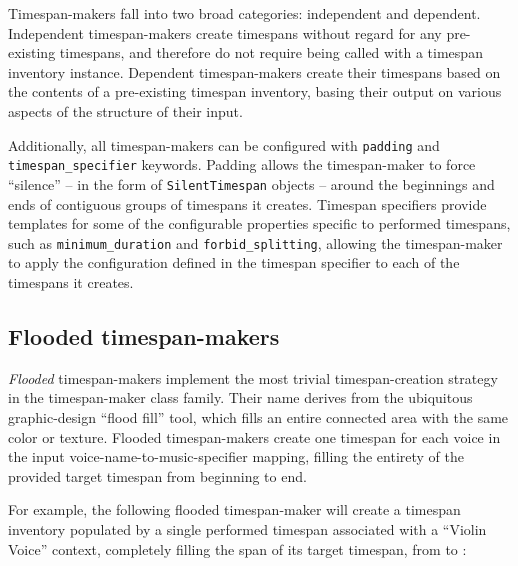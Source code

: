 Timespan-makers fall into two broad categories: independent and dependent.
Independent timespan-makers create timespans without regard for any
pre-existing timespans, and therefore do not require being called with a
timespan inventory instance. Dependent timespan-makers create their timespans
based on the contents of a pre-existing timespan inventory, basing their output
on various aspects of the structure of their input.

Additionally, all timespan-makers can be configured with \texttt{padding} and
\texttt{timespan\_specifier} keywords. Padding allows the timespan-maker to
force \enquote{silence} -- in the form of \texttt{SilentTimespan} objects --
around the beginnings and ends of contiguous groups of timespans it creates.
Timespan specifiers provide templates for some of the configurable properties
specific to performed timespans, such as \texttt{minimum\_duration} and
\texttt{forbid\_splitting}, allowing the timespan-maker to apply the
configuration defined in the timespan specifier to each of the timespans it
creates.

\subsection{Flooded timespan-makers}
\label{ssec:flooded-timespan-makers}


\emph{Flooded} timespan-makers implement the most trivial timespan-creation
strategy in the timespan-maker class family. Their name derives from the
ubiquitous graphic-design \enquote{flood fill} tool, which fills an entire
connected area with the same color or texture. Flooded timespan-makers create
one timespan for each voice in the input voice-name-to-music-specifier mapping,
filling the entirety of the provided target timespan from beginning to end.

For example, the following flooded timespan-maker will create a timespan
inventory populated by a single performed timespan associated with a
\enquote{Violin Voice} context, completely filling the span of its target
timespan, from  to :

\begin{comment}
<abjad>
music_specifiers = {'Violin Voice': 'violin music'}
target_timespan = timespantools.Timespan((1, 4), (11, 8))
flooded_timespan_maker = consort.FloodedTimespanMaker()
timespan_inventory = flooded_timespan_maker(
    music_specifiers=music_specifiers,
    target_timespan=target_timespan,
    )
print(format(timespan_inventory))
</abjad>
\end{comment}

